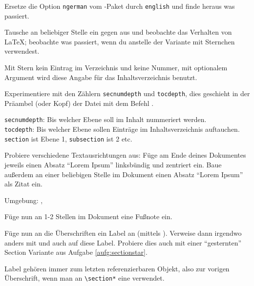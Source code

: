 \begin{uebung}
\item Ersetze die Option \texttt{ngerman} vom -Paket durch
	\texttt{english} und finde heraus was passiert.

\item Tausche an beliebiger Stelle ein  gegen 
	 aus und beobachte das Verhalten von \LaTeX; 
	beobachte was passiert, wenn du  
	anstelle der Variante mit Sternchen verwendest.
	\label{aufg:sectionstar}
	\begin{loesung}
	    Mit Stern kein Eintrag im Verzeichnis und keine Nummer, mit optionalem
	    Argument wird diese Angabe für das Inhaltsverzeichnis benutzt.
	\end{loesung}

\item Experimentiere mit den Zählern \texttt{secnumdepth} und 
	\texttt{tocdepth}, dies geschieht in der Präambel (oder Kopf) der Datei mit dem
	Befehl . \label{zaehler}
	\begin{loesung}
	    \texttt{secnumdepth}: Bis welcher Ebene soll im Inhalt nummeriert werden.\\ 
	    \texttt{tocdepth}: Bis welcher Ebene sollen Einträge im Inhaltsverzeichnis auftauchen.\\
	    \texttt{section} ist Ebene 1, \texttt{subsection} ist 2 etc.
	\end{loesung}

\item Probiere verschiedene Textausrichtungen aus: Füge am Ende
    deines Dokumentes jeweils einen Absatz \enquote{Lorem Ipsum}
    linksbündig und zentriert ein. Baue außerdem an einer beliebigen Stelle
    im Dokument einen Absatz \enquote{Lorem Ipsum} als Zitat ein.
    \begin{loesung}
        Umgebung: , 
    \end{loesung}

\item Füge nun an 1-2 Stellen im Dokument eine Fußnote ein.

\item Füge nun an die Überschriften ein Label an (mittels ).
    Verweise dann irgendwo anders mit  und auch
     auf diese Label. Probiere dies auch mit einer \enquote{gesternten}
    Section Variante aus Aufgabe \ref{aufg:sectionstar}.
    \begin{loesung}
        Label gehören immer zum letzten referenzierbaren Objekt, also zur vorigen Überschrift, wenn man an \verb|\section*| eine verwendet.
    \end{loesung}


\end{uebung}
